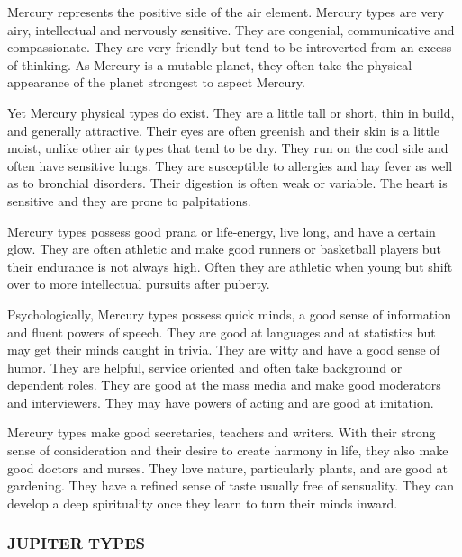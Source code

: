 Mercury represents the positive side of the air element. Mercury types are very airy, intellectual and nervously sensitive. They are congenial, communicative and compassionate. They are very friendly but tend to be introverted from an excess of thinking. As Mercury is a mutable planet, they often take the physical appearance of the planet strongest to aspect Mercury.

 

Yet Mercury physical types do exist. They are a little tall or short, thin in build, and generally attractive. Their eyes are often greenish and their skin is a little moist, unlike other air types that tend to be dry. They run on the cool side and often have sensitive lungs. They are susceptible to allergies and hay fever as well as to bronchial disorders. Their digestion is often weak or variable. The heart is sensitive and they are prone to palpitations.

 

Mercury types possess good prana or life‑energy, live long, and have a certain glow. They are often athletic and make good runners or basketball players but their endurance is not always high. Often they are athletic when young but shift over to more intellectual pursuits after puberty.

 

Psychologically, Mercury types possess quick minds, a good sense of information and fluent powers of speech. They are good at languages and at statistics but may get their minds caught in trivia. They are witty and have a good sense of humor. They are helpful, service oriented and often take background or dependent roles. They are good at the mass media and make good moderators and interviewers. They may have powers of acting and are good at imitation.

 

Mercury types make good secretaries, teachers and writers. With their strong sense of consideration and their desire to create harmony in life, they also make good doctors and nurses. They love nature, particularly plants, and are good at gardening. They have a refined sense of taste usually free of sensuality. They can develop a deep spirituality once they learn to turn their minds inward.

 



\subsubsection{JUPITER TYPES}
 

